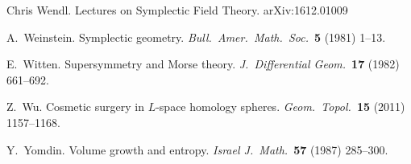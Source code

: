 \documentclass[12pt,twoside]{amsart}
\theoremstyle{plain}
\numberwithin{figure}{section}
\numberwithin{equation}{section}
\begin{document}
\begin{thebibliography}{999}
Chris Wendl.
Lectures on Symplectic Field Theory.
arXiv:1612.01009
   

A.\ Weinstein.
Symplectic geometry. {\it Bull.\ Amer.\ Math.\ Soc.}~{\bf 5} (1981) 1--13.

E.\ Witten.
Supersymmetry and Morse theory. 
{\it J.\ Differential Geom.}~{\bf 17} (1982) 661--692.

Z.\ Wu.
Cosmetic surgery in $L$-space homology spheres. 
{\it Geom.\ Topol.}~{\bf 15} (2011) 1157--1168.

Y.\ Yomdin.
Volume growth and entropy.
{\it Israel J.~Math.}~{\bf 57} (1987) 285--300.


\end{thebibliography}
\end{document}
